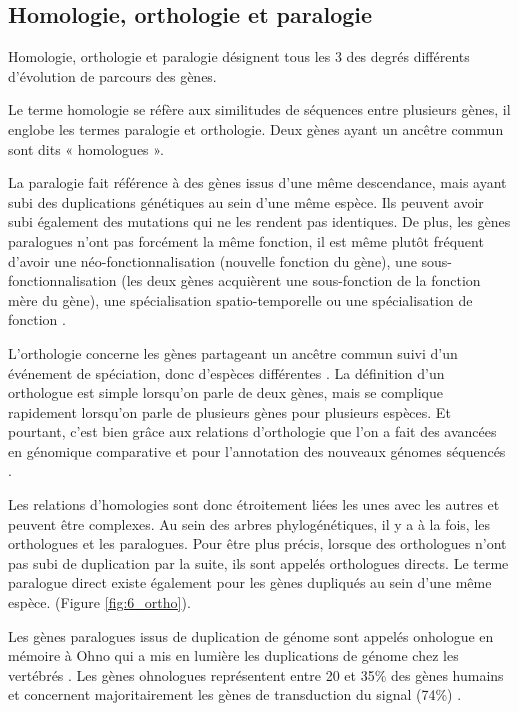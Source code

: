 \subsection{Homologie, orthologie et paralogie}\label{homologie}
\par Homologie, orthologie et paralogie désignent tous les 3 des degrés différents d’évolution de parcours des gènes. 
\par Le terme homologie se réfère aux similitudes de séquences entre plusieurs gènes, il englobe les termes paralogie et orthologie. Deux gènes ayant un ancêtre commun sont dits « homologues ».
\par La paralogie fait référence à des gènes issus d’une même descendance, mais ayant subi des duplications génétiques au sein d’une même espèce. Ils peuvent avoir subi également des mutations qui ne les rendent pas identiques. De plus, les gènes paralogues n’ont pas forcément la même fonction, il est même plutôt fréquent d’avoir une néo-fonctionnalisation (nouvelle fonction du gène), une sous-fonctionnalisation (les deux gènes acquièrent une sous-fonction de la fonction mère du gène), une spécialisation spatio-temporelle ou une spécialisation de fonction \parencite{kuzmin_retention_2022}.
\par L’orthologie concerne les gènes partageant un ancêtre commun suivi d’un événement de spéciation, donc d’espèces différentes \parencite{fitch_distinguishing_1970}. La définition d’un orthologue est simple lorsqu’on parle de deux gènes, mais se complique rapidement lorsqu’on parle de plusieurs gènes pour plusieurs espèces. Et pourtant, c’est bien grâce aux relations d’orthologie que l’on a fait des avancées en génomique comparative et pour l’annotation des nouveaux génomes séquencés \parencite{huerta-cepas_fast_2017}. 
\par Les relations d’homologies sont donc étroitement liées les unes avec les autres et peuvent être complexes. Au sein des arbres phylogénétiques, il y a à la fois, les orthologues et les paralogues. Pour être plus précis, lorsque des orthologues n’ont pas subi de duplication par la suite, ils sont appelés orthologues directs. Le terme paralogue direct existe également pour les gènes dupliqués au sein d’une même espèce. (Figure \ref{fig:6_ortho}). 
\par Les gènes paralogues issus de duplication de génome sont appelés onhologue en mémoire à Ohno qui a mis en lumière les duplications de génome chez les vertébrés \parencite{ohno_evolution_1968}. Les gènes ohnologues représentent entre 20 et 35\% des gènes humains et concernent majoritairement les gènes de transduction du signal (74\%) \parencite{singh_identification_2015}. 
